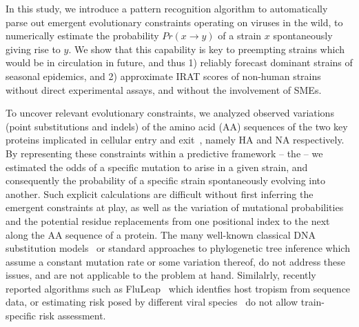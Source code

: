 \documentclass[onecolumn, compsoc,10pt]{IEEEtran}
\begin{document}

In this study, we introduce a pattern recognition algorithm to automatically parse out emergent evolutionary constraints operating on \infl viruses in the wild, to numerically estimate the probability $Pr(x \rightarrow y)$ of a strain $x$ spontaneously giving rise to  $y$. We show that this capability is key to preempting  strains which would be in circulation in future, and thus 1) reliably forecast dominant strains of seasonal epidemics, and 2) approximate IRAT scores of non-human strains without direct experimental assays, and without the involvement of SMEs.

To uncover relevant evolutionary constraints, we analyzed observed variations (point substitutions and indels) of the  amino acid (AA)  sequences  of the two key proteins implicated  in cellular entry and exit~\cite{gamblin2010influenza,shao2017evolution}, namely HA and NA respectively. By representing these constraints within a predictive framework -- the \enet -- we estimated the  odds of a specific mutation to arise in a given strain, and consequently the probability of a specific strain spontaneously  evolving into another.  Such explicit calculations are difficult  without first inferring the emergent constraints at play,  as well as  the variation of mutational probabilities and the potential residue replacements from one positional index to the next along the AA sequence of a protein. The many well-known classical  DNA  substitution models~\cite{posada1998modeltest} or standard approaches to phylogenetic tree inference which assume a constant mutation rate or some variation thereof, do not address these issues, and are not applicable to the problem at hand. Similalrly, recently reported algorithms such  as FluLeap~\cite{eng2014predicting}  which identfies host tropism from sequence data, or estimating risk posed by different viral species~\cite{grange2021ranking} do not allow train-specific risk assessment.
\end{document}
